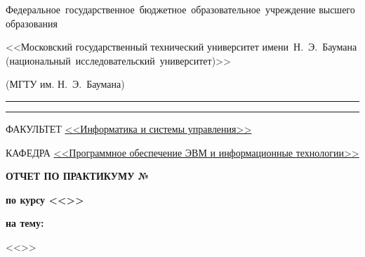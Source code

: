 \begin{titlepage}
\begin{center}
\begin{minipage}{0.85\textwidth}
{                    %
                    {Федеральное~государственное~бюджетное~образовательное~учреждение высшего образования}

                    {<<Московский государственный технический университет имени~Н.~Э.~Баумана (национальный~исследовательский~университет)>>}

                    {(МГТУ им. Н.~Э.~Баумана)}
                    \vspace{0.1cm}
                }
            \end{minipage}

        \vspace{0.2cm}
        \rule{\linewidth}{2.8pt}
        \rule[3ex]{\linewidth}{1pt}

        \begin{flushleft}
            {ФАКУЛЬТЕТ \uline{<<Информатика и системы управления>> \hfill}}

            \vspace{0.5cm}

            {КАФЕДРА \uline{<<Программное обеспечение ЭВМ и информационные технологии>> \hfill}}
        \end{flushleft}

        \vfill

        {
            \Large{\textbf{
                {ОТЧЕТ ПО ПРАКТИКУМУ №\labnumber}
            }}

            \Large{\textbf{
                {по курсу <<\coursename>>}
            }}

            \Large{\textbf{
                {на тему:}
            }}

            \large{<<\labtheme>>}

            \vspace{0.5cm}
        }

        \vspace{0.5cm}



\end{center}
\end{titlepage}
